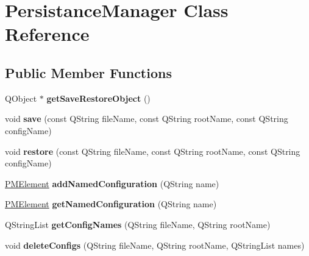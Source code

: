 \hypertarget{classPersistanceManager}{
\section{PersistanceManager Class Reference}
\label{classPersistanceManager}
}
\subsection*{Public Member Functions}
\begin{DoxyCompactItemize}
\item 
\hypertarget{classPersistanceManager_a610154c67ea20021e7d8e3f9275c0992}{
QObject $\ast$ {\bfseries getSaveRestoreObject} ()}
\label{classPersistanceManager_a610154c67ea20021e7d8e3f9275c0992}

\item 
\hypertarget{classPersistanceManager_a03a6dfbabd73201a52ebd125e4ab417e}{
void {\bfseries save} (const QString fileName, const QString rootName, const QString configName)}
\label{classPersistanceManager_a03a6dfbabd73201a52ebd125e4ab417e}

\item 
\hypertarget{classPersistanceManager_a3f4cb41b8bc6633e00fb1dcf58395c6b}{
void {\bfseries restore} (const QString fileName, const QString rootName, const QString configName)}
\label{classPersistanceManager_a3f4cb41b8bc6633e00fb1dcf58395c6b}

\item 
\hypertarget{classPersistanceManager_aba899c3429aad480bfef9cab420cb123}{
\hyperlink{classPMElement}{PMElement} {\bfseries addNamedConfiguration} (QString name)}
\label{classPersistanceManager_aba899c3429aad480bfef9cab420cb123}

\item 
\hypertarget{classPersistanceManager_a2625b70c4ea0e2b6fffda098c15dd5f4}{
\hyperlink{classPMElement}{PMElement} {\bfseries getNamedConfiguration} (QString name)}
\label{classPersistanceManager_a2625b70c4ea0e2b6fffda098c15dd5f4}

\item 
\hypertarget{classPersistanceManager_abb4df1e15f39379ffd3bbf86c4919648}{
QStringList {\bfseries getConfigNames} (QString fileName, QString rootName)}
\label{classPersistanceManager_abb4df1e15f39379ffd3bbf86c4919648}

\item 
\hypertarget{classPersistanceManager_a7f65f2aeb084529b3b1c1fe9928ce88b}{
void {\bfseries deleteConfigs} (QString fileName, QString rootName, QStringList names)}
\label{classPersistanceManager_a7f65f2aeb084529b3b1c1fe9928ce88b}

\end{DoxyCompactItemize}
